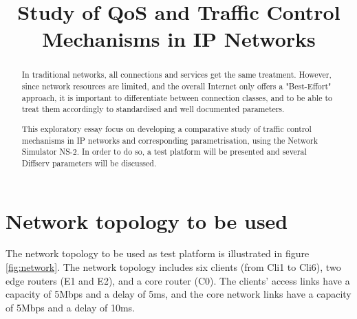 \documentclass[conference,compsoc]{IEEEtran}
\begin{document}
%
  \title{Study of QoS and Traffic Control Mechanisms in IP Networks}

  \author{
  }

\maketitle

\begin{abstract}
In traditional networks, all connections and services get the same treatment. However, since network resources are limited, and the overall Internet only offers a "Best-Effort" approach, it is important to differentiate between connection classes, and to be able to treat them accordingly to standardised and well documented parameters. \par 
This exploratory essay focus on developing a comparative study of traffic control mechanisms in IP networks and corresponding parametrisation,
     using the Network Simulator NS-2. In order to do so, a test platform will be presented and several Diffserv parameters will be discussed.
     \end{abstract}

     \IEEEpeerreviewmaketitle

     \section{Network topology to be used}

     The network topology to be used as test platform is illustrated in figure \ref{fig:network}. The network topology includes six clients (from Cli1 to Cli6), two edge routers (E1 and E2), and a core router (C0). The clients' access links have a capacity of 5Mbps and a delay of 5ms, and the core network links have a capacity of 5Mbps and a delay of 10ms.\par 
\end{document}

